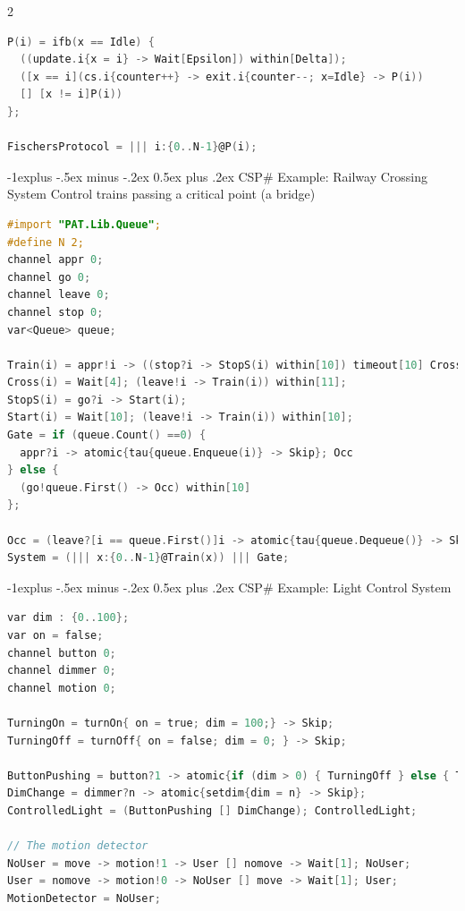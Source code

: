 \documentclass[10pt, landscape]{article}
\makeatletter
\renewcommand{\subsection}{\@startsection{subsection}{2}{0mm}%
  {-1explus -.5ex minus -.2ex}%
  {0.5ex plus .2ex}%
{\normalfont\normalsize\bfseries}}
\makeatother
\begin{document}
\begin{multicols*}{2}
\begin{lstlisting}[language=C]
P(i) = ifb(x == Idle) {
  ((update.i{x = i} -> Wait[Epsilon]) within[Delta]);
  ([x == i](cs.i{counter++} -> exit.i{counter--; x=Idle} -> P(i))
  [] [x != i]P(i))
};

FischersProtocol = ||| i:{0..N-1}@P(i);
\end{lstlisting}

  \columnbreak

  \subsection{CSP\# Example: Railway Crossing System}
  Control trains passing a critical point (a bridge)
\begin{lstlisting}[language=C, basicstyle=\scriptsize\selectfont\ttfamily]
#import "PAT.Lib.Queue";
#define N 2;
channel appr 0;
channel go 0;
channel leave 0;
channel stop 0;
var<Queue> queue;

Train(i) = appr!i -> ((stop?i -> StopS(i) within[10]) timeout[10] Cross(i));
Cross(i) = Wait[4]; (leave!i -> Train(i)) within[11];
StopS(i) = go?i -> Start(i);
Start(i) = Wait[10]; (leave!i -> Train(i)) within[10];
Gate = if (queue.Count() ==0) {
  appr?i -> atomic{tau{queue.Enqueue(i)} -> Skip}; Occ 
} else {
  (go!queue.First() -> Occ) within[10] 
};

Occ = (leave?[i == queue.First()]i -> atomic{tau{queue.Dequeue()} -> Skip}; Gate) [] (appr?i -> atomic{tau{queue.Enqueue(i)} -> stop!queue.Last() -> Skip}; Occ);
System = (||| x:{0..N-1}@Train(x)) ||| Gate;
\end{lstlisting}

  \subsection{CSP\# Example: Light Control System}
\begin{lstlisting}[language=C, basicstyle=\scriptsize\selectfont\ttfamily]
var dim : {0..100};
var on = false;
channel button 0;
channel dimmer 0;
channel motion 0;

TurningOn = turnOn{ on = true; dim = 100;} -> Skip;
TurningOff = turnOff{ on = false; dim = 0; } -> Skip;

ButtonPushing = button?1 -> atomic{if (dim > 0) { TurningOff } else { TurningOn }};
DimChange = dimmer?n -> atomic{setdim{dim = n} -> Skip};
ControlledLight = (ButtonPushing [] DimChange); ControlledLight;

// The motion detector
NoUser = move -> motion!1 -> User [] nomove -> Wait[1]; NoUser;
User = nomove -> motion!0 -> NoUser [] move -> Wait[1]; User;
MotionDetector = NoUser;


\end{lstlisting}
\end{multicols*}
\end{document}

